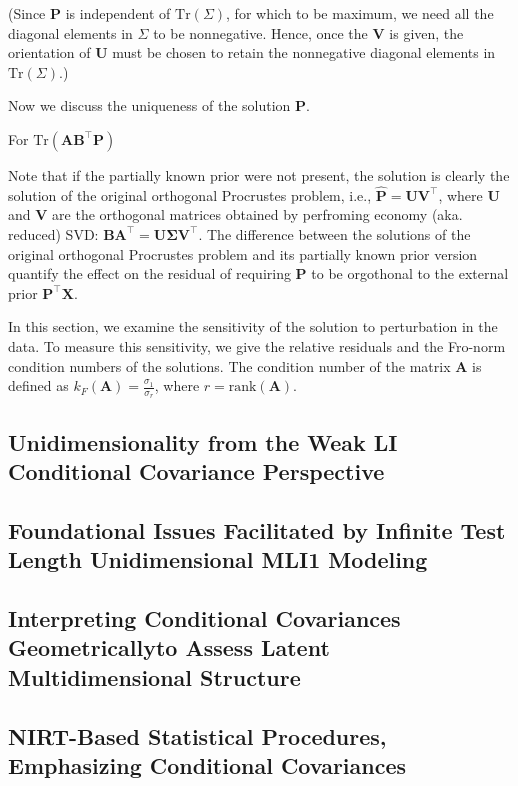 \documentclass[titlepage,11pt,twoside]{article}
\begin{document}
(Since $\mathbf{P}$ is independent of $\text{Tr}(\Sigma)$, for which to be maximum, we need all the diagonal elements in $\Sigma$ to be nonnegative. Hence, once the $\mathbf{V}$ is given, the orientation of $\mathbf{U}$ must be chosen to retain the nonnegative diagonal elements in $\text{Tr}(\Sigma)$.)

Now we discuss the uniqueness of the solution $\mathbf{P}$.

For $\text{Tr}(\mathbf{A}\mathbf{B}^{\top}\mathbf{P})$

Note that if the partially known prior were not present, the solution is clearly the solution of the original orthogonal Procrustes problem, i.e., $\mathbf{\hat{P}} = \mathbf{U}\mathbf{V}^{\top}$, where $\mathbf{U}$ and $\mathbf{V}$ are the orthogonal matrices obtained by perfroming economy (aka. reduced) SVD:
$\mathbf{B}\mathbf{A}^{\top} = \mathbf{U}\mathbf{\Sigma}\mathbf{V}^{\top}$. 
The difference between the solutions of the original orthogonal Procrustes problem and its partially known prior version quantify the effect on the residual of requiring $\mathbf{P}$ to be orgothonal to the external prior $\mathbf{P}^{\top}\mathbf{X}$.


In this section, we examine the sensitivity of the solution to perturbation in the data. To measure this sensitivity, we give the relative residuals and the Fro-norm condition numbers of the solutions. The condition number of the matrix $\mathbf{A}$ is defined as $k_{F}(\mathbf{A})=\frac{\sigma_{1}}{\sigma_{r}}$, where $r=\text{rank}(\mathbf{A})$. 


\subsection{Unidimensionality from the Weak LI Conditional Covariance Perspective}


\subsection{Foundational Issues Facilitated by Infinite Test Length Unidimensional MLI1 Modeling}

\subsection{Interpreting Conditional Covariances Geometrically\break to Assess Latent Multidimensional Structure}


\subsection{NIRT-Based Statistical Procedures, Emphasizing Conditional Covariances}
\end{document}

